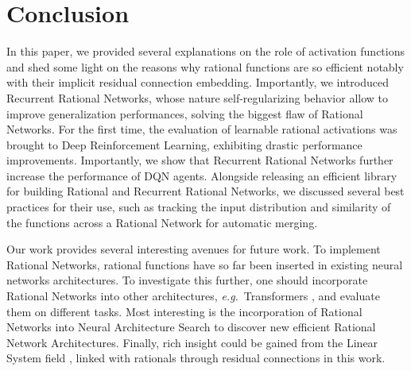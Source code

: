 \documentclass{article}
\newcommand{\eg}{\emph{e.g.}~}
\begin{document}
\section{Conclusion}
In this paper, we provided several explanations on the role of activation functions and shed some light on the reasons why rational functions are so efficient notably with their implicit residual connection embedding. Importantly, we introduced Recurrent Rational Networks, whose nature self-regularizing behavior allow to improve generalization performances, solving the biggest flaw of Rational Networks. For the first time, the evaluation of learnable rational activations was brought to Deep Reinforcement Learning, exhibiting drastic performance improvements. Importantly, we show that Recurrent Rational Networks further increase the performance of DQN agents. Alongside releasing an efficient library for building Rational and Recurrent Rational Networks, we discussed several best practices for their use, such as tracking the input distribution and similarity of the functions across a Rational Network for automatic merging.


Our work provides several interesting avenues for future work.
To implement Rational Networks, rational functions have so far been inserted in existing neural networks architectures. To investigate this further, one should incorporate Rational Networks into other architectures, \eg Transformers \cite{VaswaniSPUJGKP17},  and evaluate them on different tasks.
Most interesting is the incorporation of Rational Networks into Neural Architecture Search \cite{liu2018progressive} to discover new efficient Rational Network Architectures.
Finally, rich insight could be gained from the Linear System field \cite{luZLD18}, linked with rationals through residual connections in this work.





\end{document}
